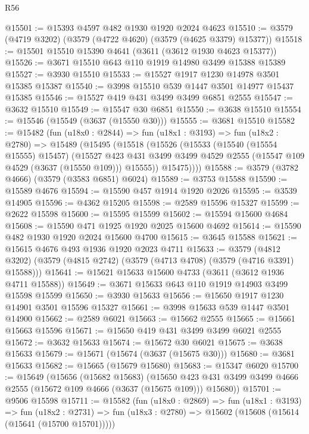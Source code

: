 \begin{lexlean}{R56}
\begin{coremodule}
@15501 := @15393 @4597 @482 @1930 @1920 @2024 @4623
@15510 := @3579 (@4719 @3202) (@3579 (@4722 @4620) (@3579 (@4625 @3379) @15377))
@15518 := @15501 @15510 @15390 @4641 (@3611 (@3612 @1930 @4623 @15377))
@15526 := @3671 @15510 @643 @110 @1919 @14980 @3499 @15388 @15389
@15527 := @3930 @15510
@15533 := @15527 @1917 @1230 @14978 @3501 @15385 @15387
@15540 := @3998 @15510 @539 @1447 @3501 @14977 @15437 @15385
@15546 := @15527 @419 @431 @3499 @3499 @6851 @2555
@15547 := @3632 @15510
@15549 := @15547 @30 @6851
@15550 := @3638 @15510
@15554 := @15546 (@15549 (@3637 (@15550 @30)))
@15555 := @3681 @15510
@15582 := @15482
    (fun (u18x0 : @2844) =>
    fun (u18x1 : @3193) =>
    fun (u18x2 : @2780) =>
    @15489
      (@15495
        (@15518
          (@15526
            (@15533
              (@15540 (@15554 @15555) @15457)
              (@15527
                @423
                @431
                @3499
                @3499
                @4529
                @2555
                (@15547 @109 @4529 (@3637 (@15550 @109)))
                @15555))
            @15475))))
@15588 := @3579 (@3782 @4666) (@3579 (@3583 @6851) @6024)
@15589 := @3753 @15588
@15590 := @15589 @4676
@15594 := @15590 @457 @1914 @1920 @2026
@15595 := @3539 @14905
@15596 := @4362 @15205
@15598 := @2589 @15596 @15327
@15599 := @2622 @15598
@15600 := @15595 @15599
@15602 := @15594 @15600 @4684
@15608 := @15590 @471 @1925 @1920 @2025 @15600 @4692
@15614 := @15590 @482 @1930 @1920 @2024 @15600 @4700
@15615 := @3645 @15588
@15621 := @15615 @4676 @493 @1936 @1920 @2023 @4711
@15633 := @3579
    (@4812 @3202)
    (@3579 (@4815 @2742) (@3579 (@4713 @4708) (@3579 (@4716 @3391) @15588)))
@15641 := @15621 @15633 @15600 @4733 (@3611 (@3612 @1936 @4711 @15588))
@15649 := @3671 @15633 @643 @110 @1919 @14903 @3499 @15598 @15599
@15650 := @3930 @15633
@15656 := @15650 @1917 @1230 @14901 @3501 @15596 @15327
@15661 := @3998 @15633 @539 @1447 @3501 @14900
@15662 := @2589 @6021
@15663 := @15662 @2555
@15665 := @15661 @15663 @15596
@15671 := @15650 @419 @431 @3499 @3499 @6021 @2555
@15672 := @3632 @15633
@15674 := @15672 @30 @6021
@15675 := @3638 @15633
@15679 := @15671 (@15674 (@3637 (@15675 @30)))
@15680 := @3681 @15633
@15682 := @15665 (@15679 @15680)
@15683 := @15347 @6020
@15700 := @15649
    (@15656
      (@15682 @15683)
      (@15650 @423 @431 @3499 @3499 @4666 @2555 (@15672 @109 @4666 (@3637 (@15675 @109))) @15680))
@15701 := @9506 @15598
@15711 := @15582
    (fun (u18x0 : @2869) =>
    fun (u18x1 : @3193) =>
    fun (u18x2 : @2731) => fun (u18x3 : @2780) => @15602 (@15608 (@15614 (@15641 (@15700 @15701)))))

\end{coremodule}
\end{lexlean}
